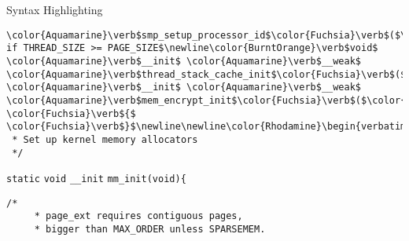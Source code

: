 \begin{frame}{Syntax Highlighting}
\begin{verbatim}
\color{Aquamarine}\verb$smp_setup_processor_id$\color{Fuchsia}\verb$($\color{BurntOrange}\verb$void$\color{Fuchsia}\verb$)$\newline\color{Fuchsia}\verb${$\newline\color{Fuchsia}\verb$}$\newline\newline\color{Gray}\verb$# if THREAD_SIZE >= PAGE_SIZE$\newline\color{BurntOrange}\verb$void$ \color{Aquamarine}\verb$__init$ \color{Aquamarine}\verb$__weak$ \color{Aquamarine}\verb$thread_stack_cache_init$\color{Fuchsia}\verb$($\color{BurntOrange}\verb$void$\color{Fuchsia}\verb$)$\newline\color{Fuchsia}\verb${$\newline\color{Fuchsia}\verb$}$\newline\color{Gray}\verb$#endif$\newline\newline\color{BurntOrange}\verb$void$ \color{Aquamarine}\verb$__init$ \color{Aquamarine}\verb$__weak$ \color{Aquamarine}\verb$mem_encrypt_init$\color{Fuchsia}\verb$($\color{BurntOrange}\verb$void$\color{Fuchsia}\verb$)$ \color{Fuchsia}\verb${$ \color{Fuchsia}\verb$}$\newline\newline\color{Rhodamine}\begin{verbatim}/*
 * Set up kernel memory allocators
 */\end{verbatim}\leavevmode\newline\color{BurntOrange}\verb$static$ \color{BurntOrange}\verb$void$ \color{Aquamarine}\verb$__init$ \color{Aquamarine}\verb$mm_init$\color{Fuchsia}\verb$($\color{BurntOrange}\verb$void$\color{Fuchsia}\verb$)$\newline\color{Fuchsia}\verb${$\newline\tab\color{Rhodamine}\begin{verbatim}/*
	 * page_ext requires contiguous pages,
	 * bigger than MAX_ORDER unless SPARSEMEM.

\end{verbatim}
\end{frame}
